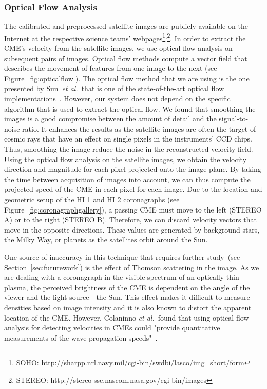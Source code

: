 \documentclass[journal]{vgtc}                %
\def\etal{\textit{et al.}}
\begin{document}
\subsubsection{Optical Flow Analysis} \label{sec:opticalflow}
The calibrated and preprocessed satellite images are publicly available on the Internet at the respective science teams' webpages\footnote{SOHO: http://sharpp.nrl.navy.mil/cgi-bin/swdbi/lasco/img\_short/form}\textsuperscript{,}\footnote{STEREO: http://stereo-ssc.nascom.nasa.gov/cgi-bin/images}. In order to extract the CME's velocity from the satellite images, we use optical flow analysis on subsequent pairs of images. Optical flow methods compute a vector field that describes the movement of features from one image to the next (see Figure~\ref{fig:opticalflow}). The optical flow method that we are using is the one presented by Sun~\etal\ that is one of the state-of-the-art optical flow implementations~\cite{sun2010secrets}. However, our system does not depend on the specific algorithm that is used to extract the optical flow. We found  that smoothing the images is a good compromise between the amount of detail and the signal-to-noise ratio.  It enhances the results as the satellite images are often the target of cosmic rays that have an effect on single pixels in the instruments' CCD chips. Thus, smoothing the image reduce the noise in the reconstructed velocity field. Using the optical flow analysis on the satellite images, we obtain the velocity direction and magnitude for each pixel projected onto the image plane. By taking the time between acquisition of images into account, we can thus compute the projected speed of the CME in each pixel for each image. Due to the location and geometric setup of the HI 1 and HI 2 coronagraphs (see Figure~\ref{fig:coronagraphgallery}), a passing CME must move to the left (STEREO A) or to the right (STEREO B). Therefore, we can discard velocity vectors that move in the opposite directions. These values are generated by background stars, the Milky Way, or planets as the satellites orbit around the Sun.

One source of inaccuracy in this technique that requires further study~(see Section~\ref{sec:futurework}) is the effect of Thomson scattering in the image. As we are dealing with a coronagraph in the visible spectrum of an optically thin plasma, the perceived brightness of the CME is dependent on the angle of the viewer and the light source---the Sun. This effect makes it difficult to measure densities based on image intensity and it is also known to distort the apparent location of the CME. However, Colaninno \etal\ found that using optical flow analysis for detecting velocities in CMEs could "provide quantitative measurements of the wave propagation speeds"~\cite{Colaninno:2006ef}.
\end{document}
